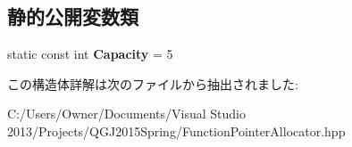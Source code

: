 \subsection*{静的公開変数類}
\begin{DoxyCompactItemize}
\item 
static const int {\bfseries Capacity} = 5\hypertarget{struct_static_function_pointer_allocator_3_01_ret_07_signiture_8_8_8_08_4_aadc5faa15517ef9c95c1b892a1091e04}{}\label{struct_static_function_pointer_allocator_3_01_ret_07_signiture_8_8_8_08_4_aadc5faa15517ef9c95c1b892a1091e04}

\end{DoxyCompactItemize}


この構造体詳解は次のファイルから抽出されました\+:\begin{DoxyCompactItemize}
\item 
C\+:/\+Users/\+Owner/\+Documents/\+Visual Studio 2013/\+Projects/\+Q\+G\+J2015\+Spring/Function\+Pointer\+Allocator.\+hpp\end{DoxyCompactItemize}
